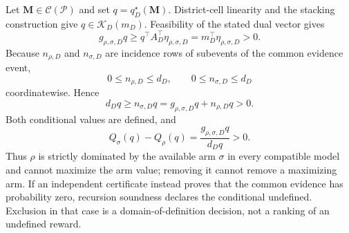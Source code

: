 Let \(\mathbf M\in\mathcal C(\mathcal P)\) and set \(q=q_D^\star(\mathbf M)\). District-cell linearity and the stacking construction give \(q\in\mathcal K_D(m_D)\). Feasibility of the stated dual vector gives
\[
g_{\rho,\sigma,D}q
\geq q^\top A_D^\top\eta_{\rho,\sigma,D}
=m_D^\top\eta_{\rho,\sigma,D}>0.
\]
Because \(n_{\rho,D}\) and \(n_{\sigma,D}\) are incidence rows of subevents of the common evidence event,
\[
0\leq n_{\rho,D}\leq d_D,
\qquad 0\leq n_{\sigma,D}\leq d_D
\]
coordinatewise. Hence
\[
d_Dq\geq n_{\sigma,D}q
=g_{\rho,\sigma,D}q+n_{\rho,D}q>0.
\]
Both conditional values are defined, and
\[
Q_\sigma(q)-Q_\rho(q)
=\frac{g_{\rho,\sigma,D}q}{d_Dq}>0.
\]
Thus \(\rho\) is strictly dominated by the available arm \(\sigma\) in every compatible model and cannot maximize the arm value; removing it cannot remove a maximizing arm. If an independent certificate instead proves that the common evidence has probability zero, recursion soundness declares the conditional undefined. Exclusion in that case is a domain-of-definition decision, not a ranking of an undefined reward.